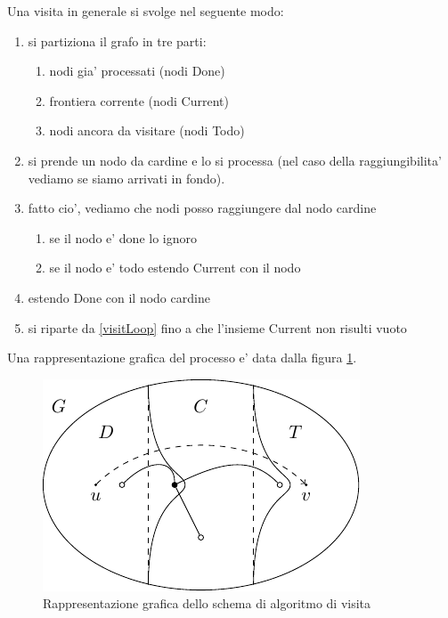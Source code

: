 Una visita in generale si svolge nel seguente modo:
\begin{enumerate}
    \item si partiziona il grafo in tre parti:
    \begin{enumerate}
        \item nodi gia' processati (nodi Done)
        \item frontiera corrente (nodi Current)
        \item nodi ancora da visitare (nodi Todo)
    \end{enumerate}
    \item\label{visitLoop} si prende un nodo da cardine e lo si processa (nel caso della raggiungibilita' vediamo se
    siamo arrivati in fondo).
    \item fatto cio', vediamo che nodi posso raggiungere dal nodo cardine
    \begin{enumerate}
        \item se il nodo e' done lo ignoro
        \item se il nodo e' todo estendo Current con il nodo
    \end{enumerate}
    \item estendo Done con il nodo cardine
    \item si riparte da \ref{visitLoop} fino a che l'insieme Current non risulti vuoto
\end{enumerate}

Una rappresentazione grafica del processo e' data dalla figura \ref{GraphVisit}.

\begin{figure}[h]
    \begin{center}
        \includegraphics{img/GraphVisit.pdf}
    \end{center}
    \caption{Rappresentazione grafica dello schema di algoritmo di visita}
    \label{GraphVisit}
\end{figure}

